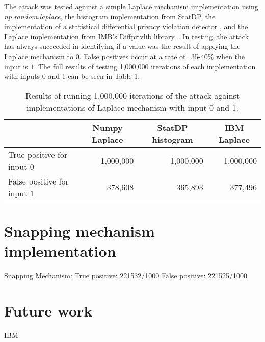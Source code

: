 \documentclass[orivec,envcountsame]{llncs}
\begin{document}
The attack was tested against a simple Laplace mechanism implementation using \textit{np.random.laplace}, the histogram implementation from StatDP, the implementation of a statistical differential privacy violation detector \cite{ding_detecting_2018}, and the Laplace implementation from IMB's Diffprivlib library~\cite{diffprivlib}. In testing, the attack has always succeeded in identifying if a value was the result of applying the Laplace mechanism to 0. False positives occur at a rate of ~35-40\% when the input is $1$. The full results of testing 1,000,000 iterations of each implementation with inputs 0 and 1 can be seen in Table \ref{tab:results}.
\begin{table}[h]
\begin{center}
\begin{tabular}{lccc}
\toprule
& \hspace{1cm}Numpy Laplace & \hspace{1cm}StatDP histogram & \hspace{1cm}IBM Laplace \\ \midrule
True positive for input $0$ & \multicolumn{1}{r}{1,000,000}  & \multicolumn{1}{r}{1,000,000} & \multicolumn{1}{r}{1,000,000}\\
False positive for input $1$ & \multicolumn{1}{r}{378,608}    & \multicolumn{1}{r}{365,893}   & \multicolumn{1}{r}{377,496}  \\ \bottomrule
\end{tabular}
\end{center}
\caption{Results of running 1,000,000 iterations of the attack against implementations of Laplace mechanism with input 0 and 1.} \label{tab:results}
\end{table}


\section{Snapping mechanism implementation}


\cite{downey2007generating}


Snapping Mechanism:
True positive: 221532/1000
False positive: 221525/1000


\section{Future work}


IBM

\newpage


\end{document}
